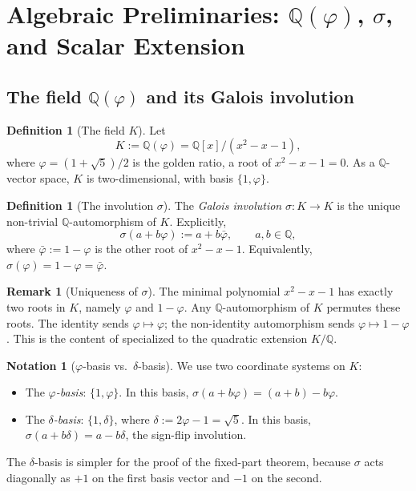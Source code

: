 \documentclass[11pt, a4paper]{amsart}
\theoremstyle{definition}
\newtheorem{definition}[theorem]{Definition}
\newtheorem{remark}[theorem]{Remark}
\newtheorem{notation}[theorem]{Notation}
\newcommand{\Q}{\mathbb{Q}}
\begin{document}
\section{Algebraic Preliminaries: $\Q(\varphi)$, $\sigma$, and Scalar Extension}
\label{sec:prelim}

\subsection{The field $\Q(\varphi)$ and its Galois involution}

\begin{definition}[The field $K$]
\label{def:K}
Let
\[
  K := \Q(\varphi) = \Q[x]/(x^2 - x - 1),
\]
where $\varphi = (1 + \sqrt{5})/2$ is the golden ratio, a root of
$x^2 - x - 1 = 0$. As a $\Q$-vector space, $K$ is two-dimensional,
with basis $\{1, \varphi\}$.
\end{definition}

\begin{definition}[The involution $\sigma$]
\label{def:sigma}
The \emph{Galois involution} $\sigma \colon K \to K$ is the unique
non-trivial $\Q$-automorphism of $K$. Explicitly,
\[
  \sigma(a + b \varphi) := a + b \bar\varphi,
  \qquad a, b \in \Q,
\]
where $\bar\varphi := 1 - \varphi$ is the other root of
$x^2 - x - 1$. Equivalently, $\sigma(\varphi) = 1 - \varphi =
\bar\varphi$.
\end{definition}

\begin{remark}[Uniqueness of $\sigma$]
The minimal polynomial $x^2 - x - 1$ has exactly two roots in $K$,
namely $\varphi$ and $1 - \varphi$. Any $\Q$-automorphism of $K$
permutes these roots. The identity sends $\varphi \mapsto \varphi$;
the non-identity automorphism sends $\varphi \mapsto 1 - \varphi$.
This is the content of \cite[Ch.~V \S 1]{LangAlgebra} specialized to
the quadratic extension $K/\Q$.
\end{remark}

\begin{notation}[$\varphi$-basis vs.\ $\delta$-basis]
\label{not:bases}
We use two coordinate systems on $K$:
\begin{itemize}
\item The \emph{$\varphi$-basis}: $\{1, \varphi\}$. In this basis,
  $\sigma(a + b\varphi) = (a + b) - b\varphi$.
\item The \emph{$\delta$-basis}: $\{1, \delta\}$, where $\delta :=
  2\varphi - 1 = \sqrt{5}$. In this basis,
  $\sigma(a + b\delta) = a - b\delta$, the sign-flip involution.
\end{itemize}
The $\delta$-basis is simpler for the proof of the fixed-part
theorem, because $\sigma$ acts diagonally as $+1$ on the first
basis vector and $-1$ on the second.
\end{notation}
\end{document}
